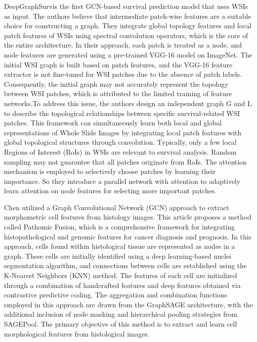 \documentclass[journal,twoside,web]{ieeecolor}
\begin{document}
DeepGraphSurv\cite{li2018graph}is the first GCN-based survival prediction model that uses WSIs as input. The authors believe that intermediate patch-wise features are a suitable choice for constructing a graph. They integrate global topology features and local patch features of WSIs using spectral convolution operators, which is the core of the entire architecture. In their approach, each patch is treated as a node, and node features are generated using a pre-trained VGG-16 model on ImageNet. The initial WSI graph is built based on patch features, and the VGG-16 feature extractor is not fine-tuned for WSI patches due to the absence of patch labels. Consequently, the initial graph may not accurately represent the topology between WSI patches, which is attributed to the limited training of feature networks.To address this issue, the authors design an independent graph G and  L to describe the topological relationships between specific survival-related WSI patches. This framework can simultaneously learn both local and global representations of Whole Slide Images by integrating local patch features with global topological structures through convolution. Typically, only a few local Regions of Interest (RoIs) in WSIs are relevant to survival analysis. Random sampling may not guarantee that all patches originate from RoIs. The attention mechanism is employed to selectively choose patches by learning their importance. So they introduce a parallel network with attention to adaptively learn attention on node features for selecting more important patches.

Chen\cite{chen2020pathomic} utilized a Graph Convolutional Network (GCN) approach to extract morphometric cell features from histology images. This article proposes a method called Pathomic Fusion, which is a comprehensive framework for integrating histopathological and genomic features for cancer diagnosis and prognosis. In this approach, cells found within histological tissue are represented as nodes in a graph. These cells are initially identified using a deep learning-based nuclei segmentation algorithm, and connections between cells are established using the K-Nearest Neighbors (KNN) method. The features of each cell are initialized through a combination of handcrafted features and deep features obtained via contrastive predictive coding. The aggregation and combination functions employed in this approach are drawn from the GraphSAGE architecture, with the additional inclusion of node masking and hierarchical pooling strategies from SAGEPool. The primary objective of this method is to extract and learn cell morphological features from histological images.
\end{document}
